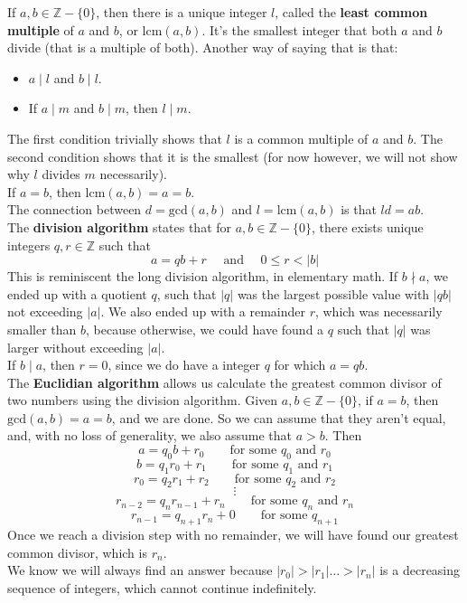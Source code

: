 \documentclass[12pt]{article}
\newcommand{\Z}{\mathbb{Z}}
\begin{document}
    If $a, b \in \Z - \{0\}$,
    then there is a unique integer $l$,
    called the \textbf{least common multiple} of $a$ and $b$,
    or $\text{lcm}(a, b)$.
    It's the smallest integer that both $a$ and $b$ divide
    (that is a multiple of both).
    Another way of saying that is that:
    \begin{itemize}[label=$\diamond$]
        \item 
            $a \mid l$ and $b \mid l$.
        \item
            If $a \mid m$ and $b \mid m$, then $l \mid m$.
    \end{itemize}
    The first condition trivially shows that $l$ is a common multiple
    of $a$ and $b$.
    The second condition shows that it is the smallest
    (for now however, we will not show why $l$ divides $m$
    necessarily). \\ 
    If $a = b$, then $\text{lcm}(a, b) = a = b$. \\
 
    The connection between $d = \text{gcd}(a, b)$
    and $l = \text{lcm}(a, b)$
    is that $ld = ab$. \\

    The \textbf{division algorithm} states that
    for $a, b \in \Z - \{0\}$,
    there exists unique integers $q, r \in \Z$ such that
    \[ a = qb + r \quad \text{ and } \quad 0 \leqslant r < |b| \]
    This is reminiscent the long division algorithm,
    in elementary math. 
    If $b \nmid a$,
    we ended up with a quotient $q$,
    such that $|q|$ was the largest possible value
    with $|qb|$ not exceeding $|a|$.
    We also ended up with a remainder $r$,
    which was necessarily smaller than $b$,
    because otherwise,
    we could have found a $q$ such that $|q|$ was larger
    without exceeding $|a|$. \\
    If $b \mid a$, then $r = 0$,
    since we do have a integer $q$ for which $a = qb$. \\

    The \textbf{Euclidian algorithm} allows us
    calculate the greatest common divisor of two numbers
    using the division algorithm.
    Given $a, b \in \Z - \{0\}$,
    if $a = b$, then $\text{gcd}(a, b) = a = b$,
    and we are done. 
    So we can assume that they aren't equal,
    and, with no loss of generality,
    we also assume that $a > b$.
    Then
    \[ a = q_0b + r_0 \qquad \text{for some $q_0$ and $r_0$} \]
    \[ b = q_1r_0 + r_1 \qquad \text{for some $q_1$ and $r_1$} \]
    \[ r_0 = q_2r_1 + r_2 \qquad \text{for some $q_2$ and $r_2$} \]
    \[ \vdots \]
    \[ r_{n-2} = q_{n}r_{n-1} + r_{n}
    \qquad \text{for some $q_n$ and $r_n$} \]
    \[ r_{n-1} = q_{n+1}r_n + 0
    \qquad \text{for some $q_{n+1}$} \]
    Once we reach a division step with no remainder,
    we will have found our greatest common divisor,
    which is $r_n$. \\
    We know we will always find an answer
    because $|r_0| > |r_1| \dots > |r_n|$
    is a decreasing sequence of integers,
    which cannot continue indefinitely. \\
\end{document}
